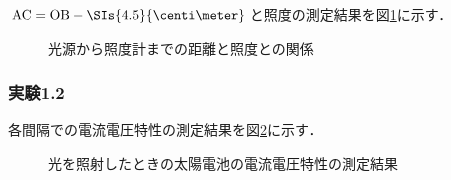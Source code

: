 \documentclass[1_power_supply.tex]{subfiles}
\begin{document}
      $\mathrm{AC}=\mathrm{OB}-\SIs{4.5}{\centi\meter}$と照度の測定結果を図\ref{fig:1_dE}に示す．


      \begin{figure}[htbp]
        \begin{center}
          \caption{光源から照度計までの距離と照度との関係}\label{fig:1_dE}
        \end{center}
      \end{figure}

    \subsubsection{実験1.2}

      各間隔での電流電圧特性の測定結果を図\ref{fig:1_VI}に示す．


      \begin{figure}[htbp]
        \begin{center}
          \caption{光を照射したときの太陽電池の電流電圧特性の測定結果}\label{fig:1_VI}
        \end{center}
      \end{figure}
\end{document}
